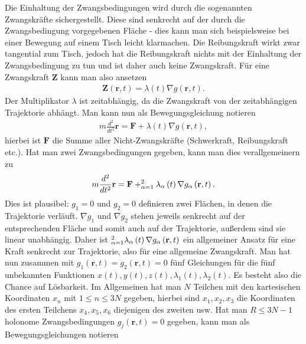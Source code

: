 \documentclass{book}
\let\sum\relax
\DeclareMathOperator*{\sum}{\raisebox{-3.5pt}{\scalebox{2}{\rotatebox{1}{{\bask Σ}}}}}
\begin{document}
Die Einhaltung der Zwangsbedingungen wird durch die sogenannten Zwangskräfte sichergestellt. Diese sind senkrecht auf der durch die Zwangsbedingung vorgegebenen Fläche - dies kann man sich beispielsweise bei einer Bewegung auf einem Tisch leicht klarmachen. Die Reibungskraft wirkt zwar tangential zum Tisch, jedoch hat die Reibungskraft nichts mit der Einhaltung der Zwangsbedingung zu tun und ist daher auch keine Zwangskraft. Für eine Zwangskraft $\mathbf{Z}$ kann man also ansetzen
%
\begin{eqnarray}
\mathbf{Z}\left(\mathbf{r}, t\right) = \lambda\left(t\right)\nabla g\left(\mathbf{r}, t\right).
\end{eqnarray}
%
Der Multiplikator $\lambda$ ist zeitabhängig, da die Zwangskraft von der zeitabhängigen Trajektorie abhängt. Man kann nun als Bewegungsgleichung notieren
%
\begin{eqnarray}
m\frac{d^2}{dt^2}\mathbf{r} = \mathbf{F} + \lambda\left(t\right)\nabla g\left(\mathbf{r}, t\right), 
\end{eqnarray}
%
hierbei ist $\mathbf{F}$ die Summe aller Nicht-Zwangskräfte (Schwerkraft, Reibungskraft etc.). Hat man zwei Zwangsbedingungen gegeben, kann man dies verallgemeinern zu
%
\begin{eqnarray}
m\frac{d^2}{dt^2}\mathbf{r} = \mathbf{F} + \sum_{\alpha = 1}^{2}\lambda_\alpha\left(t\right)\nabla g_\alpha\left(\mathbf{r}, t\right).
\end{eqnarray}
%
Dies ist plausibel: $g_1 = 0$ und $g_2 = 0$ definieren zwei Flächen, in denen die Trajektorie verläuft. $\nabla g_1$ und $\nabla g_2$ stehen jeweils senkrecht auf der entsprechenden Fläche und somit auch auf der Trajektorie, außerdem sind sie linear unabhängig. Daher ist $\sum_{\alpha = 1}^{2}\lambda_\alpha\left(t\right)\nabla g_\alpha\left(\mathbf{r}, t\right)$ ein allgemeiner Ansatz für eine Kraft senkrecht zur Trajektorie, also für eine allgemeine Zwangskraft. Man hat nun zusammen mit $g_1\left(\mathbf{r}, t\right) = g_2\left(\mathbf{r}, t\right) = 0$ fünf Gleichungen für die fünf unbekannten Funktionen $x\left(t\right), y\left(t\right), z\left(t\right), \lambda_1\left(t\right), \lambda_2\left(t\right)$. Es besteht also die Chance auf Lösbarkeit. Im Allgemeinen hat man $N$ Teilchen mit den kartesischen Koordinaten $x_n$ mit $1\leq n\leq 3N$ gegeben, hierbei sind $x_1, x_2, x_3$ die Koordinaten des ersten Teilchens $x_4, x_5, x_6$ diejenigen des zweiten usw. Hat man $R\leq 3N - 1$ holonome Zwangsbedingungen $g_j\left(\mathbf{r}, t\right) = 0$ gegeben, kann man als Bewegungsgleichungen notieren
\end{document}
